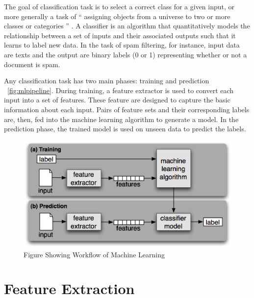 The goal of classification task is to select a correct class for a given input, or more generally a task of “ assigning objects from a universe to two or more classes or categories ” \citep{manning1999foundations}. A classifier is an algorithm that quantitatively models the relationship between a set of inputs and their associated outputs such that it learns to label new data. In the task of spam filtering, for instance, input data are texts and the output are binary labels (0 or 1) representing whether or not a document is spam. 

Any classification task has two main phases: training and prediction ~\ref{fig:mlpipeline}. During training, a feature extractor is used to convert each input into a set of features. These feature are designed to capture the basic information about each input. Pairs of feature sets and their corresponding labels are, then, fed into the machine learning algorithm to generate a model. In the prediction phase, the trained model is used on unseen data to predict the labels. 

\begin{figure}
\includegraphics[scale=.8]{../Figures/mlpipeline.png} \centering
\caption{Figure Showing Workflow of Machine Learning }
\end{figure}

\section{Feature Extraction}

